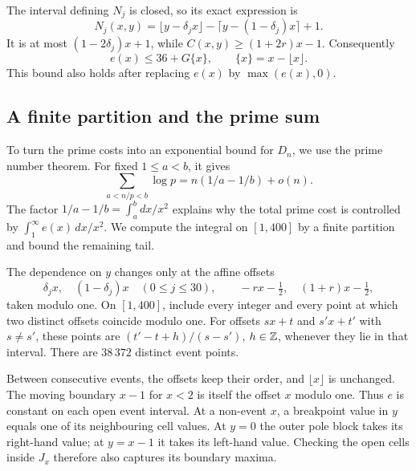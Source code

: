 The interval defining $N_j$ is closed, so its exact expression is
\[
 N_j(x,y)=\lfloor y-\delta_jx\rfloor
               -\lceil y-(1-\delta_j)x\rceil+1.
\]
It is at most $(1-2\delta_j)x+1$, while $C(x,y)\ge(1+2r)x-1$.
Consequently
\begin{equation}\label{eq:envelope-tail}
 e(x)\le36+G\{x\},\qquad \{x\}=x-\lfloor x\rfloor.
\end{equation}
This bound also holds after replacing $e(x)$ by $\max(e(x),0)$.

\subsection{A finite partition and the prime sum}
To turn the prime costs into an exponential bound for $D_n$, we use
the prime number theorem. For fixed $1\le a<b$, it gives
\[
 \sum_{a<n/p<b}\log p=n(1/a-1/b)+o(n).
\]
The factor $1/a-1/b=\int_a^b dx/x^2$ explains why the total prime
cost is controlled by $\int_1^\infty e(x)\,dx/x^2$.
We compute the integral on $[1,400]$ by a finite partition and bound
the remaining tail.

The dependence on $y$ changes only at the affine offsets
\begin{equation}\label{eq:offsets}
 \delta_jx,\quad(1-\delta_j)x\quad(0\le j\le30),
 \qquad -rx-\tfrac12,\quad(1+r)x-\tfrac12,
\end{equation}
taken modulo one. On $[1,400]$, include every integer and every
point at which two distinct offsets coincide modulo one. For offsets
$sx+t$ and $s'x+t'$ with $s\ne s'$, these points are
$(t'-t+h)/(s-s')$, $h\in\mathbb Z$, whenever they lie in that interval.
There are $38\,372$ distinct event points.

Between consecutive events, the offsets keep their order, and
$\lfloor x\rfloor$ is unchanged. The moving boundary $x-1$ for
$x<2$ is itself the offset $x$ modulo one. Thus $e$ is constant on
each open event interval. At a non-event $x$, a breakpoint value
in $y$ equals one of its neighbouring cell values. At $y=0$ the
outer pole block takes its right-hand value; at $y=x-1$ it takes
its left-hand value. Checking the open cells inside $J_x$ therefore
also captures its boundary maxima.

